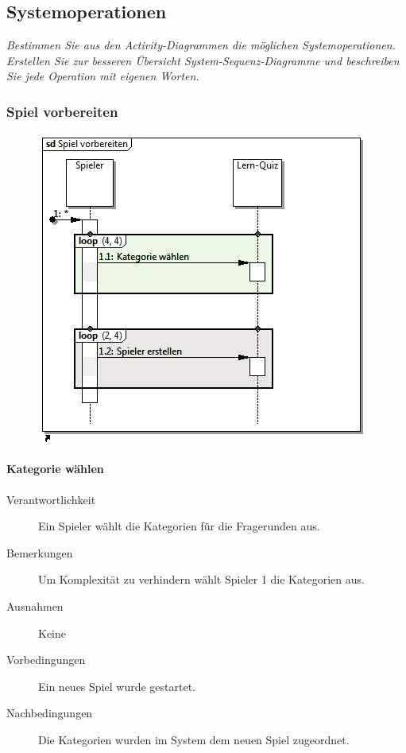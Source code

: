 \documentclass{report}
\begin{document}
\subsection{Systemoperationen}
\textit{Bestimmen Sie aus den Activity-Diagrammen die m\"oglichen Systemoperationen. Erstellen Sie zur besseren \"Ubersicht System-Sequenz-Diagramme und beschreiben Sie jede Operation mit eigenen Worten.}

\subsubsection{Spiel vorbereiten}
\begin{figure}[H]
	\includegraphics[width=\textwidth]{Diagramme/SequenceDiagram-SpielVorbereiten.jpg}
	\centering
\end{figure}

\paragraph{Kategorie wählen}
\begin{description}
	\item[Verantwortlichkeit] Ein Spieler wählt die Kategorien für die Fragerunden aus.
	\item[Bemerkungen] Um Komplexität zu verhindern wählt Spieler 1 die Kategorien aus.
	\item[Ausnahmen] Keine
	\item[Vorbedingungen] Ein neues Spiel wurde gestartet.
	\item[Nachbedingungen] Die Kategorien wurden im System dem neuen Spiel zugeordnet.
\end{description}
\end{document}
